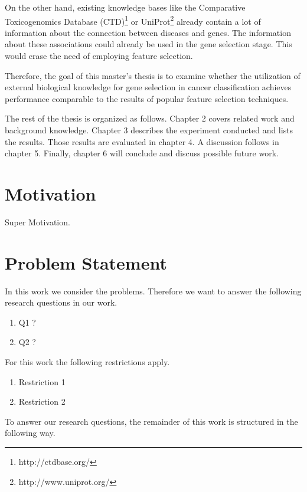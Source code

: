 On the other hand, 	existing knowledge bases like the Comparative Toxicogenomics Database (CTD)\footnote{http://ctdbase.org/} or UniProt\footnote{http://www.uniprot.org/} already contain a lot of information about the connection between diseases and genes. The information about these associations could already be used in the gene selection stage. This would erase the need of employing feature selection.

Therefore, the goal of this master's thesis is to examine whether the utilization of external biological knowledge for gene selection in cancer classification achieves performance comparable to the results of popular feature selection techniques. 

The rest of the thesis is organized as follows. Chapter 2 covers related work and background knowledge. Chapter 3 describes the experiment conducted and lists the results. Those results are evaluated in chapter 4. A discussion follows in chapter 5. Finally, chapter 6 will conclude and discuss possible future work.

\chapter{Motivation}
\label{chapter:Motivation}

Super Motivation.
\chapter{Problem Statement}
\label{chapter:problemStatement}

In this work we consider the problems.
Therefore we want to answer the following research questions in our work.
\begin{enumerate}
\item Q1 ?
\item Q2 ?
\end{enumerate}

For this work the following restrictions apply.
\begin{enumerate}
	\item Restriction 1
	\item Restriction 2
\end{enumerate}

To answer our research questions, the remainder of this work is structured in the following way.
